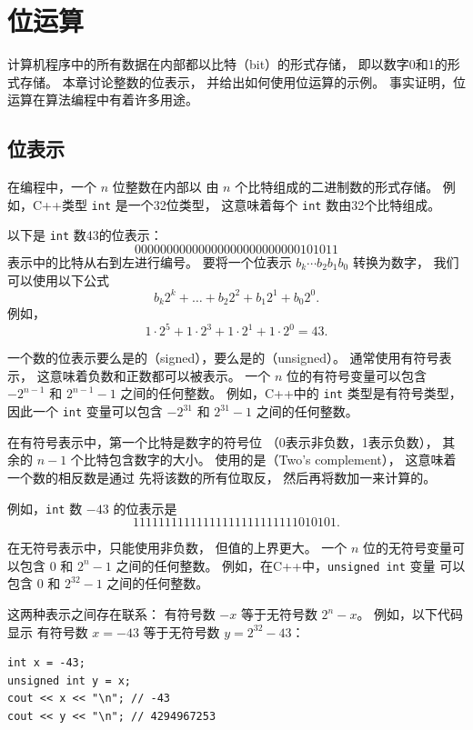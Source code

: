 \chapter{位运算}

计算机程序中的所有数据在内部都以比特（bit）的形式存储，
即以数字0和1的形式存储。
本章讨论整数的位表示，
并给出如何使用位运算的示例。
事实证明，位运算在算法编程中有着许多用途。

\section{位表示}


在编程中，一个 $n$ 位整数在内部以
由 $n$ 个比特组成的二进制数的形式存储。
例如，C++类型 \texttt{int} 是一个32位类型，
这意味着每个 \texttt{int} 数由32个比特组成。

以下是 \texttt{int} 数43的位表示：
\[00000000000000000000000000101011\]
表示中的比特从右到左进行编号。
要将一个位表示 $b_k \cdots b_2 b_1 b_0$ 转换为数字，
我们可以使用以下公式
\[b_k 2^k + \ldots + b_2 2^2 + b_1 2^1 + b_0 2^0.\]
例如，
\[1 \cdot 2^5 + 1 \cdot 2^3 + 1 \cdot 2^1 + 1 \cdot 2^0 = 43.\]

一个数的位表示要么是的（signed），要么是的（unsigned）。
通常使用有符号表示，
这意味着负数和正数都可以被表示。
一个 $n$ 位的有符号变量可以包含
$-2^{n-1}$ 和 $2^{n-1}-1$ 之间的任何整数。
例如，C++中的 \texttt{int} 类型是有符号类型，
因此一个 \texttt{int} 变量可以包含
$-2^{31}$ 和 $2^{31}-1$ 之间的任何整数。

在有符号表示中，第一个比特是数字的符号位
（0表示非负数，1表示负数），
其余的 $n-1$ 个比特包含数字的大小。
使用的是（Two's complement），
这意味着一个数的相反数是通过
先将该数的所有位取反，
然后再将数加一来计算的。

例如，\texttt{int} 数 $-43$ 的位表示是
\[11111111111111111111111111010101.\]

在无符号表示中，只能使用非负数，
但值的上界更大。
一个 $n$ 位的无符号变量可以包含
$0$ 和 $2^n-1$ 之间的任何整数。
例如，在C++中，\texttt{unsigned int} 变量
可以包含 $0$ 和 $2^{32}-1$ 之间的任何整数。

这两种表示之间存在联系：
有符号数 $-x$ 等于无符号数 $2^n-x$。
例如，以下代码显示
有符号数 $x=-43$ 等于无符号数 $y=2^{32}-43$：
\begin{lstlisting}
int x = -43;
unsigned int y = x;
cout << x << "\n"; // -43
cout << y << "\n"; // 4294967253
\end{lstlisting}

